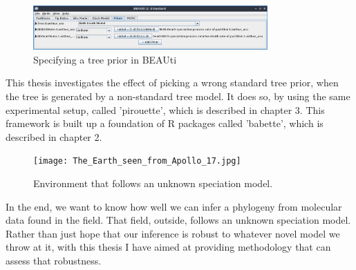 \begin{figure}[H]
  \includegraphics[width=0.8\textwidth]{beauti_tree_prior.png}
  \caption{
    Specifying a tree prior in BEAUti
 }
  \label{fig:beauti_tree_prior}
\end{figure}

This thesis investigates the effect of picking a wrong standard
tree prior, when the tree is generated 
by a non-standard tree model. 
It does so, by using the same experimental setup, called 'pirouette',
which is described in chapter 3. This framework is built up a foundation
of R packages called 'babette', which is described in chapter 2.

\begin{figure}[H]
  \texttt{[image: The\_Earth\_seen\_from\_Apollo\_17.jpg]}
  \caption{
    Environment that follows an unknown speciation model.
 }
  \label{fig:unknown_speciation_model}
\end{figure}

In the end, we want to know how well we can infer a phylogeny from
molecular data found in the field. That field, outside, 
follows an unknown speciation model. Rather than just hope that our inference
is robust to whatever novel model we throw at it, with this thesis I have aimed at providing methodology that can assess that robustness.
